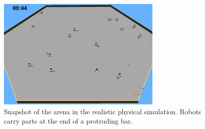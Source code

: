 




\begin{figure}[t]
\centering
\includegraphics[width=8cm]{img/overall_arena_3.png}
\caption{Snapshot of the arena in the realistic physical simulation.
Robots carry parts at the end of a protruding bar.}
\label{fig:overall_arena}
\end{figure}

